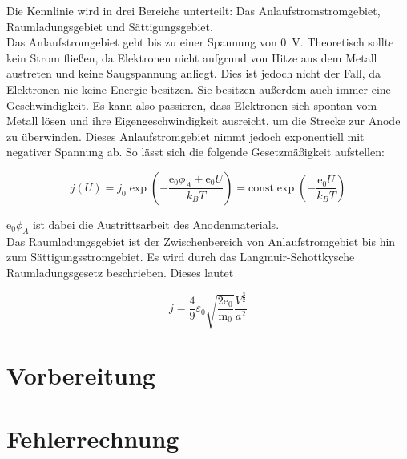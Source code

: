 \noindent Die Kennlinie wird in drei Bereiche unterteilt: Das Anlaufstromstromgebiet, Raumladungsgebiet und 
Sättigungsgebiet.\\

\noindent Das Anlaufstromgebiet geht bis zu einer Spannung von \qty{0}{\volt}. Theoretisch sollte kein Strom 
fließen, da Elektronen nicht aufgrund von Hitze aus dem Metall austreten und keine Saugspannung anliegt. 
Dies ist jedoch nicht der Fall, da Elektronen nie keine Energie besitzen. Sie besitzen außerdem auch immer 
eine Geschwindigkeit. Es kann also passieren, dass Elektronen sich spontan vom Metall lösen und ihre 
Eigengeschwindigkeit ausreicht, um die Strecke zur Anode zu überwinden. Dieses Anlaufstromgebiet nimmt jedoch 
exponentiell mit negativer Spannung ab. So lässt sich die folgende Gesetzmäßigkeit aufstellen:

\begin{equation*}
    j(U) = j_0 \exp(-\frac{\text{e}_0 \phi_A + \text{e}_0 U}{k_B T}) = \text{const} \exp(-\frac{\text{e}_0 U}{k_B T})
\end{equation*}

\noindent $\text{e}_0 \phi_A$ ist dabei die Austrittsarbeit des Anodenmaterials. \\

\noindent Das Raumladungsgebiet ist der Zwischenbereich von Anlaufstromgebiet bis hin zum Sättigungsstromgebiet. 
Es wird durch das Langmuir-Schottkysche Raumladungsgesetz beschrieben. Dieses lautet 

\begin{equation}
    j = \frac 4 9 \varepsilon_0 \sqrt{\frac{2\text{e}_0} {\text{m}_0} } \frac{V^{\frac 3 2}}{a^2}
\end{equation}



\section{Vorbereitung}

\section{Fehlerrechnung}

